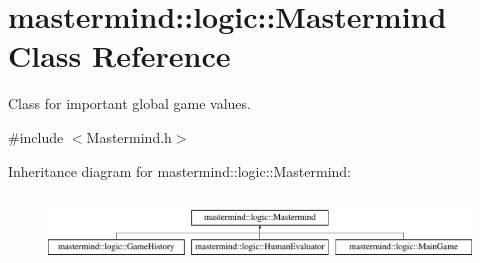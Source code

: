 \hypertarget{classmastermind_1_1logic_1_1_mastermind}{}\section{mastermind\+:\+:logic\+:\+:Mastermind Class Reference}
\label{classmastermind_1_1logic_1_1_mastermind}


Class for important global game values.  




{\ttfamily \#include $<$Mastermind.\+h$>$}

Inheritance diagram for mastermind\+:\+:logic\+:\+:Mastermind\+:\begin{figure}[H]
\begin{center}
\leavevmode
\includegraphics[height=1.736434cm]{classmastermind_1_1logic_1_1_mastermind}
\end{center}
\end{figure}
